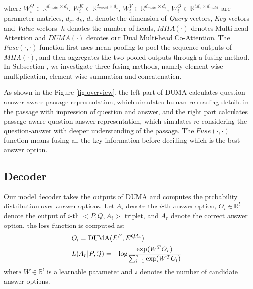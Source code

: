 \documentclass[letterpaper]{article} \usepackage{aaai21}  \usepackage{times}  \usepackage{helvet} \usepackage{courier}  \usepackage[hyphens]{url}  \usepackage{graphicx} \urlstyle{rm} \def\UrlFont{\rm}  \usepackage{natbib}  \usepackage{caption} \frenchspacing  \setlength{\pdfpagewidth}{8.5in}  \setlength{\pdfpageheight}{11in}
\begin{document}
\noindent where $W_i^Q \in \mathbb{R}^{d_{model} \times d_q}$, $W_i^K \in \mathbb{R}^{d_{model} \times d_k}$, $W_i^V \in \mathbb{R}^{d_{model} \times d_v}$, $W_i^O \in \mathbb{R}^{hd_{v} \times d_{model}}$ are parameter matrices, $d_q$, $d_k$, $d_v$ denote the dimension of \textit{Query} vectors, \textit{Key} vectors and \textit{Value} vectors, $h$ denotes the number of heads, $MHA(\cdot)$ denotes Multi-head Attention and $DUMA(\cdot)$ denotes our Dual Multi-head Co-Attention. The $Fuse(\cdot,\cdot)$ function first uses mean pooling to pool the sequence outputs of $MHA(\cdot)$, and then aggregates the two pooled outputs through a fusing method. In Subsection \textit{}, we investigate three fusing methods, namely element-wise multiplication, element-wise summation and concatenation. 

As shown in the Figure \ref{fig:overview}, the left part of DUMA calculates question-answer-aware passage representation, which simulates human re-reading details in the passage with impression of question and answer, and the right part calculates passage-aware question-answer representation, which simulates re-considering the question-answer with deeper understanding of the passage. The $Fuse(\cdot,\cdot)$ function means fusing all the key information before deciding which is the best answer option.

\subsection {Decoder}
Our model decoder takes the outputs of DUMA and computes the probability distribution over answer options. Let $A_i$ denote the $i$-th answer option, $O_i \in \mathbb{R}^l $ denote the output of $i$-th $<P,Q,A_i>$ triplet, and $A_r$ denote the correct answer option, the loss function is computed as:
\begin{equation}
\begin{split}
	&O_i = {\rm DUMA}(E^P,E^{QA_i}) \\
	&L(A_r|P,Q) = -{\rm log}\frac{{\rm exp}(W^TO_r)}{\sum^s_{i=1}{\rm exp}(W^TO_i)} \nonumber
	\end{split}
\end{equation}
where $W \in \mathbb{R}^l $ is a learnable parameter and $s$ denotes the number of candidate answer options.
\end{document}
